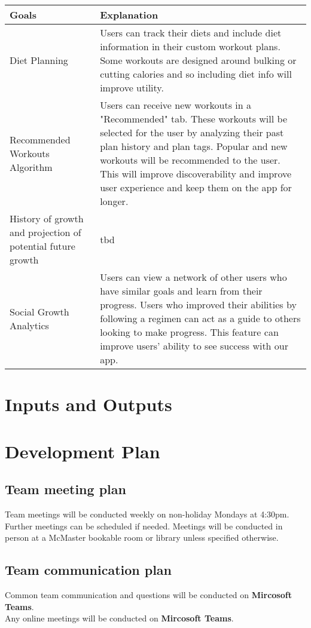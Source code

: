 \documentclass{article}
\begin{document}
\begin{tabular}{ |p{5cm}|p{8cm}| }
	\hline
	Goals & Explanation \\
	\hline
	Diet Planning & Users can track their diets and include diet information in their custom workout plans. Some workouts are
	designed around bulking or cutting calories and so including diet info will improve utility. \\
	\hline
	Recommended Workouts Algorithm & Users can receive new workouts in a "Recommended" tab. These workouts will be selected for the user by analyzing
	their past plan history and plan tags. Popular and new workouts will be recommended to the user. This will improve discoverability and improve
	 user experience and keep them on the app for longer.  \\
	\hline
	History of growth and projection of potential future growth & tbd \\
	\hline
	Social Growth Analytics & Users can view a network of other users who have similar goals and learn from their progress.
	Users who improved their abilities by following a regimen can act as a guide to others looking to make progress. This feature can improve
	users' ability to see success with our app. \\
	\hline
\end{tabular}



\section{Inputs and Outputs}

\section {Development Plan}

\subsection{Team meeting plan}
Team meetings will be conducted weekly on non-holiday Mondays at 4:30pm.
Further meetings can be scheduled if needed.
Meetings will be conducted in person at a McMaster bookable room or library unless specified otherwise.

\subsection{Team communication plan}
Common team communication and questions will be conducted on \textbf{Mircosoft Teams}.\\
Any online meetings will be conducted on \textbf{Mircosoft Teams}. \\
\end{document}
